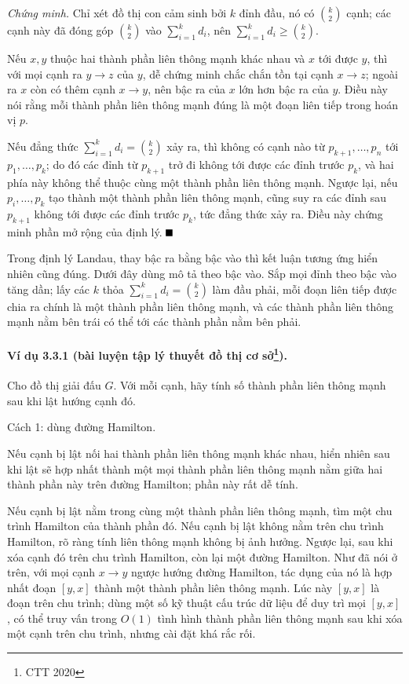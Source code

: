 \documentclass[11pt]{article}
\providecommand{\square}{\mathord{\vcenter{\hrule height .6em width .6em}}}
\begin{document}
\emph{Chứng minh.}
Chỉ xét đồ thị con cảm sinh bởi $k$ đỉnh đầu, nó có $\binom{k}{2}$ cạnh; các cạnh
này đã đóng góp $\binom{k}{2}$ vào $\sum_{i=1}^k d_i$, nên
$\sum_{i=1}^k d_i\ge \binom{k}{2}$.

Nếu $x,y$ thuộc hai thành phần liên thông mạnh khác nhau và $x$ tới được $y$,
thì với mọi cạnh ra $y\to z$ của $y$, dễ chứng minh chắc chắn tồn tại cạnh
$x\to z$; ngoài ra $x$ còn có thêm cạnh $x\to y$, nên bậc ra của $x$ lớn hơn
bậc ra của $y$. Điều này nói rằng mỗi thành phần liên thông mạnh đúng là một
đoạn liên tiếp trong hoán vị $p$.

Nếu đẳng thức $\sum_{i=1}^k d_i=\binom{k}{2}$ xảy ra, thì không có cạnh nào từ
$p_{k+1},\ldots,p_n$ tới $p_1,\ldots,p_k$; do đó các đỉnh từ $p_{k+1}$ trở đi
không tới được các đỉnh trước $p_k$, và hai phía này không thể thuộc cùng một
thành phần liên thông mạnh. Ngược lại, nếu $p_i,\ldots,p_k$ tạo thành một thành
phần liên thông mạnh, cũng suy ra các đỉnh sau $p_{k+1}$ không tới được các đỉnh
trước $p_k$, tức đẳng thức xảy ra. Điều này chứng minh phần mở rộng của định lý.
\hfill$\square$

Trong định lý Landau, thay bậc ra bằng bậc vào thì kết luận tương ứng hiển nhiên
cũng đúng. Dưới đây dùng mô tả theo bậc vào. Sắp mọi đỉnh theo bậc vào tăng dần;
lấy các $k$ thỏa $\sum_{i=1}^k d_i=\binom{k}{2}$ làm đầu phải, mỗi đoạn liên
tiếp được chia ra chính là một thành phần liên thông mạnh, và các thành phần
liên thông mạnh nằm bên trái có thể tới các thành phần nằm bên phải.

\paragraph{Ví dụ 3.3.1 (bài luyện tập lý thuyết đồ thị cơ sở\protect\footnote{CTT 2020}).}
Cho đồ thị giải đấu $G$. Với mỗi cạnh, hãy tính số thành phần liên thông mạnh
sau khi lật hướng cạnh đó.

Cách 1: dùng đường Hamilton.

Nếu cạnh bị lật nối hai thành phần liên thông mạnh khác nhau, hiển nhiên sau khi
lật sẽ hợp nhất thành một mọi thành phần liên thông mạnh nằm giữa hai thành phần
này trên đường Hamilton; phần này rất dễ tính.

Nếu cạnh bị lật nằm trong cùng một thành phần liên thông mạnh, tìm một chu trình
Hamilton của thành phần đó. Nếu cạnh bị lật không nằm trên chu trình Hamilton,
rõ ràng tính liên thông mạnh không bị ảnh hưởng. Ngược lại, sau khi xóa cạnh đó
trên chu trình Hamilton, còn lại một đường Hamilton. Như đã nói ở trên, với mọi
cạnh $x\to y$ ngược hướng đường Hamilton, tác dụng của nó là hợp nhất đoạn
$[y,x]$ thành một thành phần liên thông mạnh. Lúc này $[y,x]$ là đoạn trên chu
trình; dùng một số kỹ thuật cấu trúc dữ liệu để duy trì mọi $[y,x]$, có thể
truy vấn trong $O(1)$ tình hình thành phần liên thông mạnh sau khi xóa một cạnh
trên chu trình, nhưng cài đặt khá rắc rối.
\end{document}
